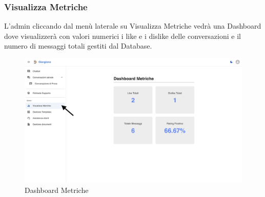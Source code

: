 \subsubsection{Visualizza Metriche}
L'admin cliccando dal menù laterale su Visualizza Metriche vedrà una Dashboard dove visualizzerà con valori numerici i like e i dislike delle conversazioni e il numero di messaggi totali gestiti dal Database.
\begin{figure}[h!]
    \centering
    \includegraphics[width=\textwidth]{./img/visualizzaMetriche.png}
    \caption{Dashboard Metriche}
    \label{fig:Metriche}
\end{figure}

